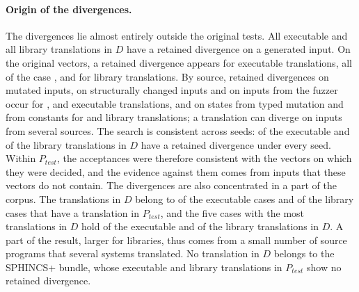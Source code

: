 \paragraph{Origin of the divergences.} The divergences lie almost entirely outside the original tests. All \rqDivTransLayerGeneratedExeAllNum{} executable and all \rqDivTransLayerGeneratedLibAllNum{} library translations in $D$ have a retained divergence on a generated input. On the original vectors, a retained divergence appears for \rqDivTransLayerSExeAllNum{} executable translations, all of the case , and for \rqDivTransLayerVectorLibAllNum{} library translations. By source, retained divergences on mutated inputs, on structurally changed inputs and on inputs from the fuzzer occur for \rqDivTransLayerMExeAllNum{}, \rqDivTransLayerMSExeAllNum{} and \rqDivTransLayerAExeAllNum{} executable translations, and on states from typed mutation and from constants for \rqDivTransLayerRandomLibAllNum{} and \rqDivTransLayerDictLibAllNum{} library translations; a translation can diverge on inputs from several sources. The search is consistent across seeds: \rqSeedDetThreeExeAllNum{} of the \rqFPExeAllNum{} executable and \rqSeedDetThreeLibAllNum{} of the \rqFPLibAllNum{} library translations in $D$ have a retained divergence under every seed. Within $P_{\mathit{test}}$, the acceptances were therefore consistent with the vectors on which they were decided, and the evidence against them comes from inputs that these vectors do not contain. The divergences are also concentrated in a part of the corpus. The translations in $D$ belong to  of the executable cases and  of the library cases that have a translation in $P_{\mathit{test}}$, and the five cases with the most translations in $D$ hold  of the executable and  of the library translations in $D$. A part of the result, larger for libraries, thus comes from a small number of source programs that several systems translated. No translation in $D$ belongs to the SPHINCS+ bundle, whose \rqPtestExePOneNum{} executable and \rqPtestLibPOneNum{} library translations in $P_{\mathit{test}}$ show no retained divergence.

